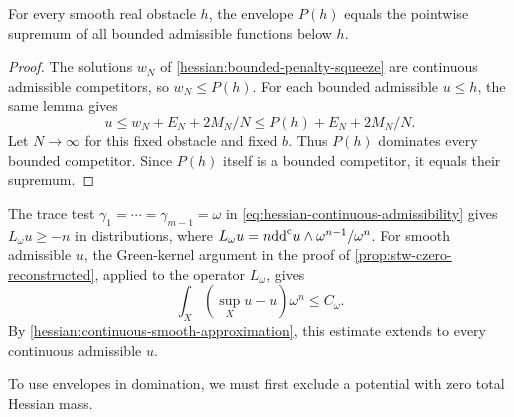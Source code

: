 \begin{proposition}\label{hessian:bounded-envelope}
For every smooth real obstacle $h$, the envelope $P(h)$ equals the
pointwise supremum of all bounded admissible functions below $h$.
\end{proposition}
\begin{proof}
The solutions $w_N$ of \cref{hessian:bounded-penalty-squeeze} are
continuous admissible competitors, so $w_N\leq P(h)$. For each
bounded admissible $u\leq h$, the same lemma gives
\[
 u\leq w_N+E_N+2M_N/N\leq P(h)+E_N+2M_N/N.
\]
Let $N\to\infty$ for this fixed obstacle and fixed $b$.
Thus $P(h)$ dominates every bounded competitor. Since $P(h)$ itself
is a bounded competitor, it equals their supremum.
\end{proof}

The trace test $\gamma_1=\cdots=\gamma_{m-1}=\omega$ in
\eqref{eq:hessian-continuous-admissibility} gives
$L_\omega u\geq-n$ in distributions, where
$L_\omega u=n\mathrm{dd}^{\mathrm{c}} u\wedge\omega^{n-1}/\omega^n$.
For smooth admissible $u$, the Green-kernel argument in the proof of
\cref{prop:stw-czero-reconstructed}, applied to the operator
$L_\omega$, gives
\begin{equation}\label{eq:hessian-normalized-l1}
 \int_X(\sup_Xu-u)\omega^n\leq C_\omega.
\end{equation}
By \cref{hessian:continuous-smooth-approximation}, this estimate
extends to every continuous admissible $u$.

To use envelopes in domination, we must first exclude a potential with
zero total Hessian mass.

